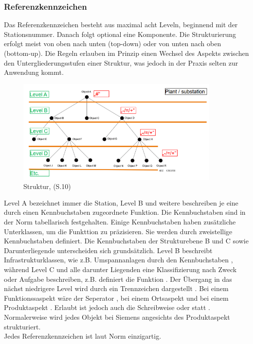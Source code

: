 \subsubsection{Referenzkennzeichen}
\label{sub:refref}
Das Referenzkennzeichen besteht aus maximal acht Leveln, beginnend mit der Stationsnummer. Danach folgt optional eine  Komponente. 
Die Strukturierung erfolgt meist von oben nach unten (top-down) oder von unten nach oben (bottom-up). Die Regeln erlauben im Prinzip einen Wechsel des Aspekts zwischen den Untergliederungsstufen einer Struktur, was jedoch in der Praxis selten zur Anwendung kommt.
\begin{figure}[H]
   \begin{center}
   \includegraphics[width=0.9\textwidth]{Bilder/produktstruktur} 
   \caption{Struktur, \cite{10}(S.10)} 
   \label{fig:struktur} 
   \end{center}
\end{figure}
Level A bezeichnet immer die Station, Level B und weitere beschreiben je eine durch einen Kennbuchstaben zugeordnete Funktion. Die Kennbuchstaben sind in der Norm tabellarisch festgehalten.
Einige Kennbuchstaben haben zusätzliche Unterklassen, um die Funkttion zu präzisieren. Sie werden durch zweistellige Kennbuchstaben definiert.
Die Kennbuchstaben der Strukturebene B und C sowie Darunterliegende unterscheiden sich grundsätzlich. Level B beschreibt Infrastrukturklassen, wie z.B. Umspannanlagen durch den Kennbuchstaben , während Level C und alle darunter Liegenden eine Klassifizierung nach Zweck oder Aufgabe beschreiben, z.B. definiert  die Funktion .  
Der Übergang in das nächst niedrigere Level wird durch ein Trennzeichen dargestellt . Bei einem Funktionssaspekt wäre der Seperator \markss{=}, bei einem Ortsaspekt \markss{+} und bei einem Produktaspekt \markss{-}.
Erlaubt ist jedoch auch die Schreibweise  oder  statt .\\
Normalerweise wird jedes Objekt bei Siemens angesichts des Produktaspekt strukturiert. \\
Jedes Referenzkennzeichen ist laut Norm einzigartig.
\newpage
